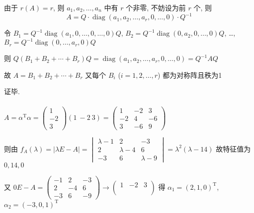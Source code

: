 		 由于 \( r(A) = r \), 则 \( a_{1}, a_{2}, \dots, a_{n} \) 中有 \( r \) 个非零, 不妨设为前 \( r \) 个, 则
		 \[ A = Q \cdot \operatorname{diag}(a_{1}, a_{2}, \dots, a_{r}, 0, \dots, 0) \cdot Q^{-1} \]

		 令 \( B_{1} = Q^{-1}\operatorname{diag}(a_{1}, 0, \dots, 0, \dots, 0)Q \), \( B_{2} = Q^{-1}\operatorname{diag}(0, a_{2}, 0, \dots, 0)Q \), \dots, \( B_{r} = Q^{-1}\operatorname{diag}(0, \dots, a_{r}, 0)Q \)

		 则 \( Q(B_{1} + B_{2} + \cdots + B_{r})Q = \operatorname{diag}(a_{1}, a_{2}, \dots, a_{r}, 0, \dots, 0) = Q^{-1}AQ \)

		 故 \( A = B_{1} + B_{2} + \cdots + B_{r} \) 又每个 \( B_{i} \) (\( i=1,2,\dots,r \)) 都为对称阵且秩为1

		 证毕.


	 \paragraph{} %
		 \( A = \alpha^{\mathrm{T}}\alpha = \begin{pmatrix}
			 1  \\
			 -2 \\
			 3
		 \end{pmatrix}(1\ -2\ 3) = \begin{pmatrix}
			 1  & -2 & 3  \\
			 -2 & 4  & -6 \\
			 3  & -6 & 9
		 \end{pmatrix} \)

		 则由 \( f_{A}(\lambda) = |\lambda E - A| = \begin{vmatrix}
			 \lambda-1 & 2         & -3        \\
			 2         & \lambda-4 & 6         \\
			 -3        & 6         & \lambda-9
		 \end{vmatrix} = \lambda^{2}(\lambda-14) \) 故特征值为 \( 0, 14, 0 \)

		 又 \( 0E-A = \begin{pmatrix}
			 -1 & 2  & -3 \\
			 2  & -4 & 6  \\
			 -3 & 6  & -9
		 \end{pmatrix} \rightarrow \begin{pmatrix}
			 1 & -2 & 3 \\
			   &    &   \\
			   &    &
		 \end{pmatrix} \) 得 \( \alpha_{1} = (2, 1, 0)^{\mathrm{T}} \), \( \alpha_{2} = (-3, 0, 1)^{\mathrm{T}} \)

